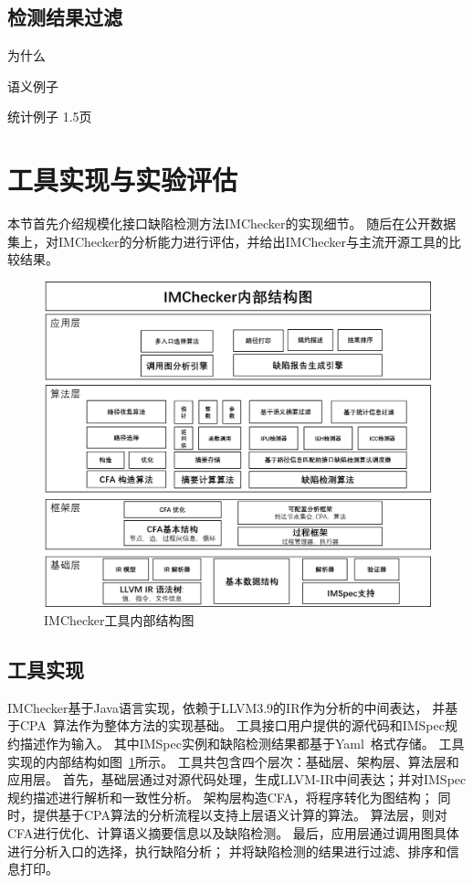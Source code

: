 %


\subsection{检测结果过滤}
为什么

语义例子

统计例子
1.5页
\section{工具实现与实验评估}
\label{sec:3.4}
本节首先介绍规模化接口缺陷检测方法IMChecker的实现细节。
随后在公开数据集上，对IMChecker的分析能力进行评估，并给出IMChecker与主流开源工具的比较结果。

\begin{figure}[t]
	\centering
	\includegraphics[width=0.9\linewidth]{figures/cp3-implementation.png}
	\caption{
		IMChecker工具内部结构图
	}
	\label{fig:3-4-implementation}
\end{figure}

\subsection{工具实现}
IMChecker基于Java语言实现，依赖于LLVM3.9的IR作为分析的中间表达，
并基于CPA~\cite{07-cav-cpachecker}算法作为整体方法的实现基础。
工具接口用户提供的源代码和IMSpec规约描述作为输入。
其中IMSpec实例和缺陷检测结果都基于Yaml~\cite{yaml}格式存储。
工具实现的内部结构如图~\ref{fig:3-4-implementation}所示。
工具共包含四个层次：基础层、架构层、算法层和应用层。
首先，基础层通过对源代码处理，生成LLVM-IR中间表达；并对IMSpec规约描述进行解析和一致性分析。
架构层构造CFA，将程序转化为图结构；
同时，提供基于CPA算法的分析流程以支持上层语义计算的算法。
算法层，则对CFA进行优化、计算语义摘要信息以及缺陷检测。
最后，应用层通过调用图具体进行分析入口的选择，执行缺陷分析；
并将缺陷检测的结果进行过滤、排序和信息打印。

